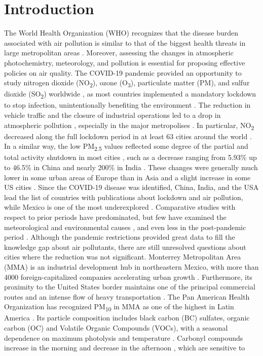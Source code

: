 \documentclass[preprint,12pt]{elsarticle}
\begin{document}
\section*{Introduction}
The World Health Organization (WHO) recognizes that the disease burden associated with air pollution is similar to that of the biggest health threats in large metropolitan areas \citep{organization2021}. Moreover, assessing the changes in atmospheric photochemistry, meteorology, and pollution is essential for proposing effective policies on air quality. The COVID-19 pandemic provided an opportunity to study nitrogen dioxide (NO\textsubscript{2}), ozone (O\textsubscript{3}), particulate matter (PM), and sulfur dioxide (SO\textsubscript{2}) worldwide \citep{Kumari_2020}, as most countries implemented a mandatory lockdown to stop infection, unintentionally benefiting the environment \citep{Han_2022,Ravindra_2022}. The reduction in vehicle traffic and the closure of industrial operations led to a drop in atmospheric pollution \citep{Barr__2021,Sicard2020,Sharma_2020,Venter_2020}, especially in the major metropolises \citep{Saha_2022,Slezakova_2021}. In particular, NO\textsubscript{2} decreased along the full lockdown period in at least 63 cities around the world \citep{Sokhi2021}. In a similar way, the low PM\textsubscript{2.5} values reflected some degree of the partial and total activity shutdown in most cities \citep{Chauhan_2020,Saha_2022}, such as a decrease ranging from 5.93\% \citep{Bao2020} up to 46.5\% \citep{Xu_2020} in China and nearly 200\% in India \citep{Kotnala_2020}. These changes were generally much lower in some urban areas of Europe than in Asia \citep{Sicard2020,Fu_2020} and a slight increase in some US cities \citep{Zangari_2020,Archer_2020}. Since the COVID-19 disease was identified, China, India, and the USA lead the list of countries with publications about lockdown and air pollution, while Mexico is one of the most underexplored \citep{Aboagye}. Comparative studies with respect to prior periods have predominated, but few have examined the meteorological and environmental causes \citep{Hernández-Paniagua2021,Bontempi_2022,ZORAN}, and even less in the post-pandemic period \citep{Priya}. Although the pandemic restrictions provided great data to fill the knowledge gap about air pollutants, there are still unresolved questions about cities where the reduction was not significant. Monterrey Metropolitan Area (MMA) is an industrial development hub in northeastern Mexico, with more than 4000 foreign-capitalized companies accelerating urban growth \citep{20152018}. Furthermore, its proximity to the United States border maintains one of the principal commercial routes and an intense flow of heavy transportation \citep{cmm2019}. The Pan American Health Organization has recognized PM\textsubscript{10} in MMA as one of the highest in Latin America \citep{Riojas-Rodríguez2016}. Its particle composition includes black carbon (BC) \citep{Peralta_2019} sulfates, organic carbon (OC) \citep{Mancilla_2019} and Volatile Organic Compounds (VOCs), with a seasonal dependence on maximum photolysis and temperature \citep{Menchaca_Torre_2015}. Carbonyl compounds increase in the morning and decrease in the afternoon \citep{j2012}, which are sensitive to 
\end{document}

